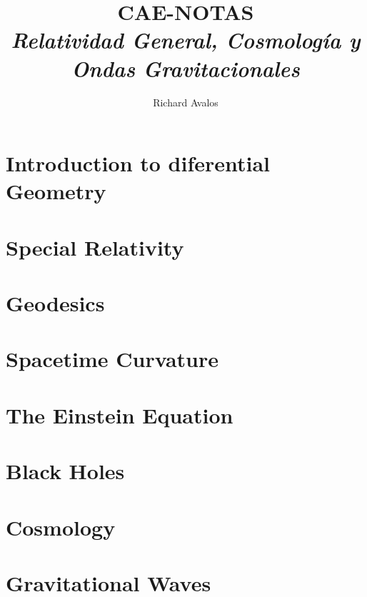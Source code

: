 \documentclass[11pt]{article}
\begin{document}
	\title{{CAE-NOTAS}\\{\normalsize{\itshape Relatividad General, Cosmología y Ondas Gravitacionales}}}
	\author{Richard Avalos}
	\maketitle
	\newpage
 
	\pagestyle{fancynotes}

        \part{Introduction to diferential Geometry}
        

        \part{Special Relativity}
        

        \part{Geodesics}
        

        \part{Spacetime Curvature}
        

        \part{The Einstein Equation}
        

        \part{Black Holes}
        

        \part{Cosmology}
        

        \part{Gravitational Waves}
        
\end{document}
